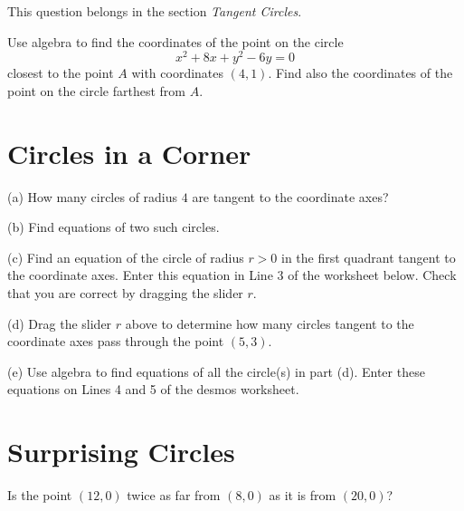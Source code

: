 \documentclass{ximera}
\begin{document}
\begin{question}   \label{Q:3435r55533}
This question belongs in the section \emph{Tangent Circles}.

Use algebra to find the coordinates of the point on the circle
\[
     x^2 + 8x + y^2 - 6y = 0
\]
closest to the point $A$ with coordinates $(4,1)$. Find also the coordinates of the point on the circle farthest from $A$.
\end{question}



\section*{Circles in a Corner}
\begin{question}  \label{Q3442dsfdsf55t}
(a) How many circles of radius $4$ are tangent to the coordinate axes? 

(b) Find equations of two such circles.

(c) Find an equation of the circle of radius $r > 0$ in the first quadrant tangent to the coordinate axes. Enter this equation in Line 3 of the worksheet below. Check that you are correct by dragging the slider $r$.

\begin{exploration}
\begin{onlineOnly}
    \begin{center}
\end{center}
\end{onlineOnly}

(d) Drag the slider $r$ above to determine how many circles tangent to the coordinate axes pass through the point $(5,3)$. 

(e) Use algebra to find equations of all the circle(s) in part (d). Enter these equations on Lines 4 and 5 of the desmos worksheet.



\end{exploration}

\end{question}




\section*{Surprising Circles}

\begin{exercise}  
  Is the point $(12,0)$ twice as far from $(8,0)$ as it is from $(20,0)$? 
  \begin{multipleChoice}  
        \end{multipleChoice}  
\end{exercise}  
\end{document}
